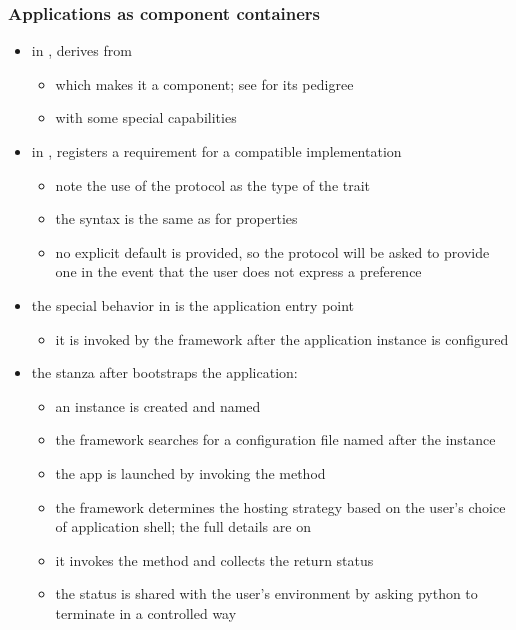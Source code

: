 \begin{frame}
%
  \frametitle{Applications as component containers}
%
  \begin{itemize}
%
  \item in ,  derives from
    \begin{itemize}
    \item which makes it a component; see  for its
      pedigree
    \item with some special capabilities
    \end{itemize}
%
  \item in ,  registers a requirement
    for a  compatible implementation
    \begin{itemize}
    \item note the use of the protocol as the type of the trait
    \item the syntax is the same as for properties
    \item no explicit default is provided, so the protocol will be asked to provide one in the
      event that the user does not express a preference
    \end{itemize}
%
  \item the special behavior  in  is the
    application entry point
    \begin{itemize}
    \item it is invoked by the framework after the application instance is configured
    \end{itemize}
%
  \item the stanza after  bootstraps the application:
    \begin{itemize}
    \item an instance is created and named
    \item the framework searches for a configuration file named after the instance
    \item the app is launched by invoking the method 
    \item the framework determines the hosting strategy based on the user's choice of
      application shell; the full details are on 
    \item it invokes the method  and collects the return status
    \item the status is shared with the user's environment by asking python to terminate in a
      controlled way
    \end{itemize}
%
  \end{itemize}
%
\end{frame}

